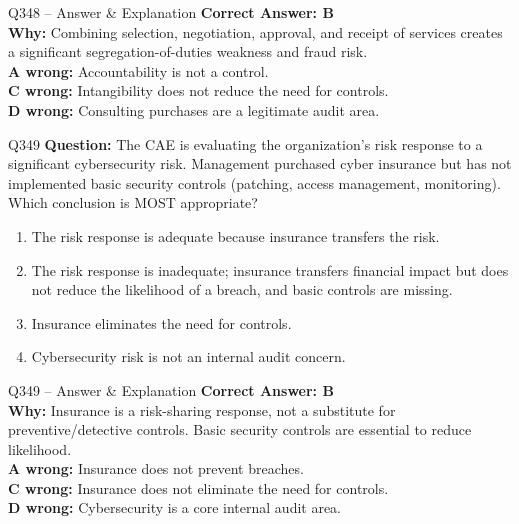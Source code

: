 \documentclass[aspectratio=169,10pt]{beamer}
\begin{document}
	\begin{frame}[t]{Q348 -- Answer \& Explanation}
		\small
		\textbf{Correct Answer: B} \\[4pt]
		\textbf{Why:} Combining selection, negotiation, approval, and receipt of services creates a significant segregation-of-duties weakness and fraud risk. \\[4pt]
		\textbf{A wrong:} Accountability is not a control. \\[2pt]
		\textbf{C wrong:} Intangibility does not reduce the need for controls. \\[2pt]
		\textbf{D wrong:} Consulting purchases are a legitimate audit area.
	\end{frame}
	
	\begin{frame}[t]{Q349}
		\small
		\textbf{Question:} The CAE is evaluating the organization's risk response to a significant cybersecurity risk. Management purchased cyber insurance but has not implemented basic security controls (patching, access management, monitoring). Which conclusion is MOST appropriate?
		\begin{enumerate}[label=\Alph*.,itemsep=1pt,topsep=2pt]
			\item The risk response is adequate because insurance transfers the risk.
			\item The risk response is inadequate; insurance transfers financial impact but does not reduce the likelihood of a breach, and basic controls are missing.
			\item Insurance eliminates the need for controls.
			\item Cybersecurity risk is not an internal audit concern.
		\end{enumerate}
	\end{frame}
	
	\begin{frame}[t]{Q349 -- Answer \& Explanation}
		\small
		\textbf{Correct Answer: B} \\[4pt]
		\textbf{Why:} Insurance is a risk-sharing response, not a substitute for preventive/detective controls. Basic security controls are essential to reduce likelihood. \\[4pt]
		\textbf{A wrong:} Insurance does not prevent breaches. \\[2pt]
		\textbf{C wrong:} Insurance does not eliminate the need for controls. \\[2pt]
		\textbf{D wrong:} Cybersecurity is a core internal audit area.
	\end{frame}
	
\end{document}
